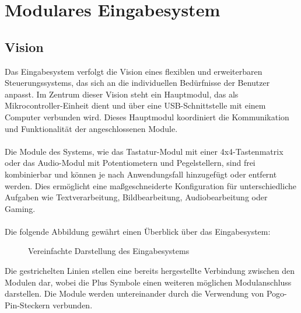 \chapter{Modulares Eingabesystem}
\section{Vision}
Das Eingabesystem verfolgt die Vision eines flexiblen und erweiterbaren Steuerungssystems, das sich an die individuellen Bedürfnisse der Benutzer anpasst. Im Zentrum dieser Vision steht ein Hauptmodul, das als Mikrocontroller-Einheit dient und über eine USB-Schnittstelle mit einem Computer verbunden wird. Dieses Hauptmodul koordiniert die Kommunikation und Funktionalität der angeschlossenen Module.
\\
\\
Die Module des Systems, wie das Tastatur-Modul mit einer 4x4-Tastenmatrix oder das Audio-Modul mit Potentiometern und Pegelstellern, sind frei kombinierbar und können je nach Anwendungsfall hinzugefügt oder entfernt werden. Dies ermöglicht eine maßgeschneiderte Konfiguration für unterschiedliche Aufgaben wie Textverarbeitung, Bildbearbeitung, Audiobearbeitung oder Gaming.
\\
\\
Die folgende Abbildung gewährt einen Überblick über das Eingabesystem:
\begin{figure}[H]
    \centering    
    \caption{Vereinfachte Darstellung des Eingabesystems}
    \label{A3TPHP}
\end{figure}
\noindent Die gestrichelten Linien stellen eine bereits hergestellte Verbindung zwischen den Modulen dar, wobei die \glqq Plus\grqq{} Symbole einen weiteren möglichen Modulanschluss darstellen. Die Module werden untereinander durch die Verwendung von Pogo-Pin-Steckern verbunden.
